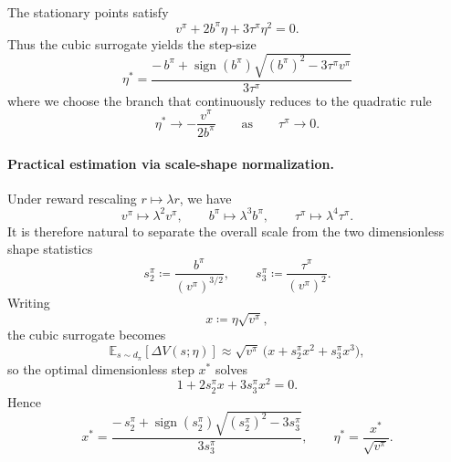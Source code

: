 \documentclass[11pt]{article}
\theoremstyle{definition}
\theoremstyle{remark}
\newcommand{\E}{\mathbb{E}}
\begin{document}
The stationary points satisfy
\begin{equation}
  v^\pi + 2b^\pi \eta + 3\tau^\pi \eta^2 = 0.
\end{equation}
Thus the cubic surrogate yields the step-size
\begin{equation}\label{eq:eta-star-third-order}
  \boxed{
  \eta^*
  =
  \frac{
    -\,b^\pi
    +
    \operatorname{sign}(b^\pi)\sqrt{(b^\pi)^2 - 3\tau^\pi v^\pi}
  }{
    3\tau^\pi
  }}
\end{equation}
where we choose the branch that continuously reduces to the quadratic rule
\[
  \eta^* \to -\frac{v^\pi}{2b^\pi}
  \qquad\text{as}\qquad
  \tau^\pi \to 0.
\]

\paragraph{Practical estimation via scale-shape normalization.}
Under reward rescaling $r \mapsto \lambda r$, we have
\[
  v^\pi \mapsto \lambda^2 v^\pi,
  \qquad
  b^\pi \mapsto \lambda^3 b^\pi,
  \qquad
  \tau^\pi \mapsto \lambda^4 \tau^\pi.
\]
It is therefore natural to separate the overall scale from the two dimensionless shape statistics
\begin{equation}
  s_2^\pi \coloneqq \frac{b^\pi}{(v^\pi)^{3/2}},
  \qquad
  s_3^\pi \coloneqq \frac{\tau^\pi}{(v^\pi)^2}.
\end{equation}
Writing
\[
  x \coloneqq \eta \sqrt{v^\pi},
\]
the cubic surrogate becomes
\begin{equation}
  \E_{s\sim d_\pi}[\Delta V(s;\eta)]
  \approx
  \sqrt{v^\pi}\,\Big(x + s_2^\pi x^2 + s_3^\pi x^3\Big),
\end{equation}
so the optimal dimensionless step $x^*$ solves
\begin{equation}
  1 + 2s_2^\pi x + 3s_3^\pi x^2 = 0.
\end{equation}
Hence
\begin{equation}
  x^*
  =
  \frac{
    -\,s_2^\pi
    +
    \operatorname{sign}(s_2^\pi)\sqrt{(s_2^\pi)^2 - 3s_3^\pi}
  }{
    3s_3^\pi
  },
  \qquad
  \eta^* = \frac{x^*}{\sqrt{v^\pi}}.
\end{equation}
\end{document}
